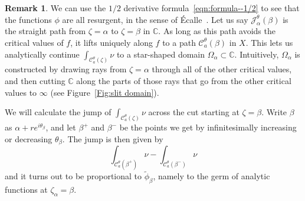 \documentclass{article}
\newcommand{\C}{\mathbb{C}}
\newcommand{\series}[1]{\tilde{#1}}
\theoremstyle{definition}
\newtheorem{remark}[definition]{Remark}
\theoremstyle{plain}
\begin{document}
\begin{remark}
We can use the $1/2$ derivative formula~\eqref{eqn:formula--1/2} to see that the functions $\phi$ are all resurgent, in the sense of \'{E}calle~\cite[Section~1]{EcalleI}. Let us say $\mathcal{J}_\alpha^\theta(\beta)$ is the straight path from $\zeta = \alpha$ to $\zeta = \beta$ in $\C$. As long as this path avoids the critical values of $f$, it lifts uniquely along $f$ to a path $\mathcal{C}_a^\theta(\beta)$ in $X$. This lets us analytically continue $\int_{\mathcal{C}_a^\theta(\zeta)} \nu$ to a star-shaped domain $\Omega_\alpha \subset \C$. Intuitively, $\Omega_\alpha$ is constructed by drawing rays from $\zeta = \alpha$ through all of the other critical values, and then cutting $\C$ along the parts of those rays that go from the other critical values to $\infty$ (see Figure~\ref{Fig:slit domain}).
\begin{center}
\label{Fig:slit domain}
\end{center}


We will calculate the jump of $\int_{\mathcal{C}_a^\theta(\zeta)}\nu$ across the cut starting at $\zeta = \beta$. Write $\beta$ as $\alpha + re^{i\theta_\beta}$, and let $\beta^+$ and $\beta^-$ be the points we get by infinitesimally increasing or decreasing $\theta_\beta$. The jump is then given by \[\int_{\mathcal{C}_a^\theta(\beta^+)} \nu - \int_{\mathcal{C}_a^\theta(\beta^-)} \nu\] 
and it turns out to be proportional to $\series{\phi}_\beta$, namely to the germ of analytic functions at $\zeta_\alpha=\beta$. %


\end{remark}
\end{document}
